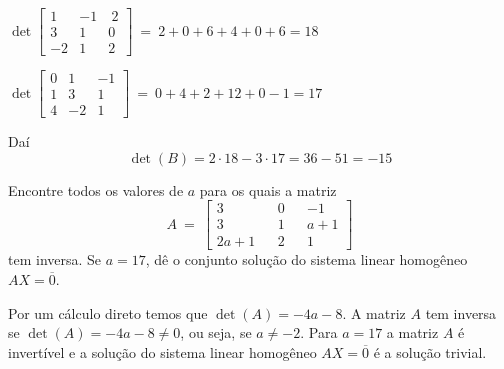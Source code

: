 \begin{solution}
\medskip
\hspace{3cm}$\det \left[ \begin{array}{rrr}
 1 & -1 & \  2 \\
 3 &  1 &  0 \\  
-2 &  1 &  2
\end{array} \right]\ =\ 2 + 0 + 6 + 4 + 0 + 6 = 18$

\medskip
\hspace{3cm}$\det \left[ \begin{array}{rrr}
 0 &  1 & -1 \\
 1 &  3 &  1 \\  
 4 & -2 &  1
\end{array} \right]\ =\ 0 + 4 + 2 + 12 + 0 - 1 = 17$

\medskip
Daí
$$\det(B) = 2 \cdot 18 - 3 \cdot 17 = 36 - 51 = -15$$
\end{solution}

\begin{problem}
Encontre todos os valores de $a$ para os quais a matriz
$$A\ =\ \left[\begin{array}{ccccc}
     3  & &  0 & &  -1  \\
     3  & &  1 & & a+1  \\
  2a+1  & &  2 & &   1 \end{array}\right] $$
tem inversa. Se $a=17$, dê o conjunto solução do sistema linear homogêneo $AX=\overline{0}$.
\end{problem}
\begin{solution}
Por um cálculo direto temos que $\det(A)=-4a-8$. A matriz $A$ tem inversa se $\det(A)=-4a-8 \neq 0$, ou seja, se $a\neq -2$.
Para $a=17$ a matriz $A$ é invertível e a solução do sistema linear homogêneo $AX=\overline{0}$ é a solução trivial.
\end{solution}

